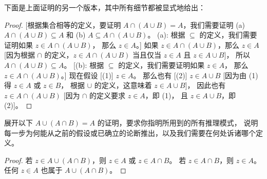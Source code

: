 \documentclass[../../../include/open-logic-section]{subfiles}
\begin{document}
下面是上面证明的另一个版本，其中所有细节都被显式地给出：
\begin{proof}{}
[根据集合相等的定义，要证明 $A \cap (A \cup B) = A$，我们需要证明
  (a) $A \cap (A \cup B) \subseteq A$ 和 (b) $A \subseteq A \cap (A \cup B)$。
  (a): 根据 $\subseteq$ 的定义，我们需要证明如果 $z \in A \cap (A \cup B)$，
  那么 $z \in A$。] 如果 $z \in A \cap (A \cup B)$，那么 $z \in A$
  [因为根据 $\cap$ 的定义，$z \in A \cap (A \cup B)$ 当且仅当 $z \in A$ 且 $z \in A \cup B$]，
  所以 $A \cap (A \cup B) \subseteq A$。
  [(b): 根据 $\subseteq$ 的定义，我们需要证明如果 $z \in A$，
  那么 $z \in A \cap (A \cup B)$。] 现在假设 [(1)] $z \in A$。
  那么也有 [(2)] $z \in A \cup B$ [因为由 (1) 得 $z \in A$ 或 $z \in B$，
  根据 $\cup$ 的定义，这意味着 $z \in A \cup B$]，
  因此也有 $z \in A \cap (A \cup B)$ [因为 $\cap$ 的定义要求 $z \in A$，即 (1)，
  且 $z \in A \cup B$，即 (2)]。
\end{proof}

\begin{prob}
展开以下 $A \cup (A \cap B) = A$ 的证明，要求你指明所用到的所有推理模式，
说明每一步为何能从之前的假设或已确立的论断推出，以及我们需要在何处诉诸哪个定义。
\begin{proof}
  若 $z \in A \cup (A \cap B)$，则 $z \in A$ 或 $z \in A \cap B$。
  若 $z \in A \cap B$，则 $z \in A$。
  任何 $z \in A$ 也属于 $A \cup (A \cap B)$。
\end{proof}
\end{prob}
\end{document}
